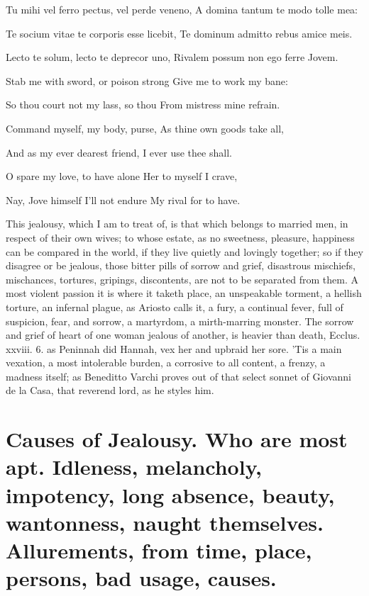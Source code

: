 {Tu mihi vel ferro pectus, vel perde veneno,
A domina tantum te modo tolle mea:

Te socium vitae te corporis esse licebit,
Te dominum admitto rebus amice meis.

Lecto te solum, lecto te deprecor uno,
Rivalem possum non ego ferre Jovem.


Stab me with sword, or poison strong
Give me to work my bane:

So thou court not my lass, so thou
From mistress mine refrain.

Command myself, my body, purse,
As thine own goods take all,

And as my ever dearest friend,
I ever use thee shall.

O spare my love, to have alone
Her to myself I crave,

Nay, Jove himself I'll not endure
My rival for to have.

This jealousy, which I am to treat of, is that which belongs to married
men, in respect of their own wives; to whose estate, as no sweetness,
pleasure, happiness can be compared in the world, if they live quietly
and lovingly together; so if they disagree or be jealous, those bitter
pills of sorrow and grief, disastrous mischiefs, mischances, tortures,
gripings, discontents, are not to be separated from them. A most
violent passion it is where it taketh place, an unspeakable torment, a
hellish torture, an infernal plague, as Ariosto calls it, a fury, a
continual fever, full of suspicion, fear, and sorrow, a martyrdom, a
mirth-marring monster. The sorrow and grief of heart of one woman
jealous of another, is heavier than death, Ecclus. xxviii. 6. as
Peninnah did Hannah, vex her and upbraid her sore. 'Tis a main
vexation, a most intolerable burden, a corrosive to all content, a
frenzy, a madness itself; as Beneditto Varchi proves out of that
select sonnet of Giovanni de la Casa, that reverend lord, as he styles
him.

\section[Causes of Jealousy]{Causes of Jealousy. Who are most apt. Idleness, melancholy, impotency, long absence, beauty, wantonness, naught themselves. Allurements, from time, place, persons, bad usage, causes.}

}
